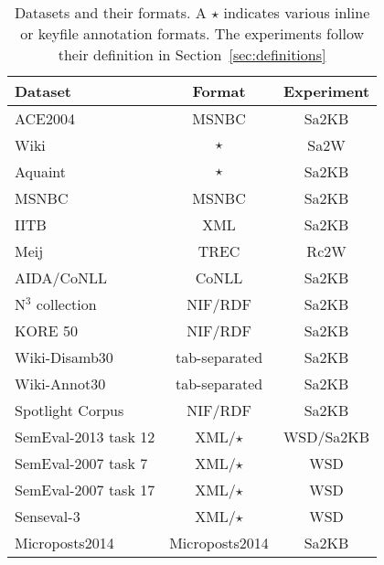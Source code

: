 \begin{table}[htb]
\centering
\begin{tabulary}{\columnwidth}{LCC}
\toprule
Dataset                 & Format    & Experiment\\
\toprule
ACE2004                 & MSNBC     & Sa2KB\\
Wiki                    & $\star$   & Sa2W \\
Aquaint                 & $\star$   & Sa2KB\\
MSNBC                   & MSNBC     & Sa2KB\\
IITB                    & XML       & Sa2KB\\
Meij                    & TREC      & Rc2W \\
AIDA/CoNLL              & CoNLL     & Sa2KB \\
N$^3$ collection        & NIF/RDF   & Sa2KB \\
KORE 50                 & NIF/RDF   & Sa2KB \\
Wiki-Disamb30           & tab-separated & Sa2KB \\
Wiki-Annot30            & tab-separated & Sa2KB \\
Spotlight Corpus        & NIF/RDF   & Sa2KB \\
SemEval-2013 task 12    & XML/$\star$&WSD/Sa2KB\\
SemEval-2007 task 7     & XML/$\star$&WSD\\
SemEval-2007 task 17    & XML/$\star$&WSD\\
Senseval-3              & XML/$\star$&WSD\\
Microposts2014          & Microposts2014 & Sa2KB\\
\bottomrule
\end{tabulary}
\caption{Datasets and their formats. A $\star$ indicates various inline or keyfile annotation formats. The experiments follow their definition in Section~\ref{sec:definitions}}
\label{tab:datasetformats}
\end{table}